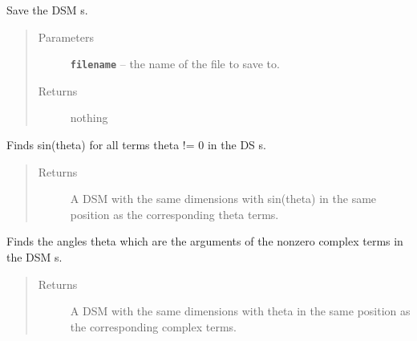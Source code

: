 \documentclass[letterpaper,10pt,english]{sphinxmanual}
\begin{document}
\begin{fulllineitems}
\begin{fulllineitems}
\begin{quote}
\begin{description}
\end{description}\end{quote}

\end{fulllineitems}


\begin{fulllineitems}
\label{index:DictionarySparseMatrix.DS.save_dict}
Save the DSM s.
\begin{quote}\begin{description}
\item[{Parameters}] \leavevmode
\textbf{\texttt{filename}} -- the name of the file to save to.

\item[{Returns}] \leavevmode
nothing

\end{description}\end{quote}

\end{fulllineitems}


\begin{fulllineitems}
\label{index:DictionarySparseMatrix.DS.sin}
Finds sin(theta) for all terms theta != 0 in the DS s.
\begin{quote}\begin{description}
\item[{Returns}] \leavevmode
A DSM with the same dimensions with sin(theta) in the      same position as the corresponding theta terms.

\end{description}\end{quote}

\end{fulllineitems}


\begin{fulllineitems}
\label{index:DictionarySparseMatrix.DS.sparse_angles}
Finds the angles theta which are the arguments of the nonzero      complex terms in the DSM s.
\begin{quote}\begin{description}
\item[{Returns}] \leavevmode
A DSM with the same dimensions with theta in the same      position as the corresponding complex terms.


\end{description}
\end{quote}
\end{fulllineitems}
\end{fulllineitems}
\end{document}
